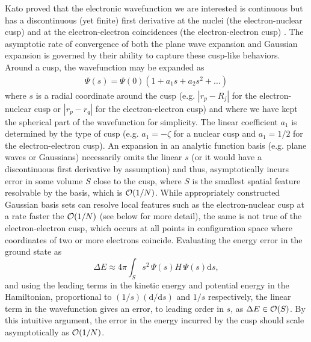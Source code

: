 \documentclass[superscriptaddress,aps,pra,nofootinbib,notitlepage,10pt,longbibliography]{revtex4-1}
\begin{document}
Kato proved that the electronic wavefunction we are interested is continuous but has a discontinuous (yet finite) first derivative at the nuclei (the electron-nuclear cusp) and at the electron-electron coincidences (the electron-electron cusp) \cite{Kato1957}. The asymptotic rate of convergence of both the plane wave expansion and Gaussian expansion is governed by their ability to capture these cusp-like behaviors. Around a cusp, the wavefunction may be expanded as
\begin{align}
\Psi\left(s\right) = \Psi\left(0\right)\left(1 + a_1 s + a_2 s^2 + \ldots\right)
\end{align}
where $s$ is a radial coordinate around the cusp (e.g. $|r_p -R_j|$ for the electron-nuclear cusp or $|r_p - r_q|$ for the electron-electron cusp) and where we have kept the spherical part of the wavefunction for simplicity. The linear coefficient $a_1$ is determined by the type of cusp (e.g. $a_1 = -\zeta$ for a nuclear cusp and $a_1 = 1/2$ for the electron-electron cusp). An expansion in an analytic function basis (e.g. plane waves or Gaussians) necessarily omits the linear $s$ (or it would have a discontinuous first derivative by assumption) and thus, asymptotically incurs error in some volume $S$ close to the cusp, where $S$ is the smallest spatial feature resolvable by the basis, which is ${\cal O}(1/N)$. While appropriately constructed Gaussian basis sets can resolve local features such as the electron-nuclear cusp at a rate faster the ${\cal O}(1/N)$ (see below for more detail), the same is not true of the electron-electron cusp, which occurs at all points in configuration space where coordinates of two or more electrons coincide. Evaluating the energy error in the ground state as
\begin{equation}
\Delta E \approx 4\pi \int_S s^2\, \Psi\left(s\right) H \, \Psi\left(s\right) \textrm{d}s,
\end{equation}
and using the leading terms in the kinetic energy and potential energy in the Hamiltonian, proportional to  $(1/s)(\textrm{d}/\textrm{d}s)$ and $1/s$ respectively, the linear term in the wavefunction gives an error, to leading order in $s$, as $\Delta E \in {\cal O}(S)$. By this intuitive argument, the error in the energy incurred by the cusp should scale asymptotically as ${\cal O}(1/N)$.
\end{document}
